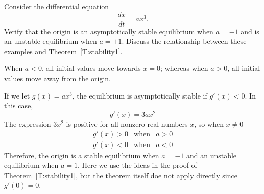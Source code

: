 \documentclass{ximera}
\begin{document}
\begin{exercise} \label{c3.3.5}
Consider the differential equation
\[
\frac{dx}{dt} = a x^3.
\]
Verify that the origin is an asymptotically
stable equilibrium when $a = -1$ and is an unstable
equilibrium when $a = +1$. Discuss the relationship
between these examples and Theorem~\ref{T:stability1}.

\begin{solution}

\ans When $a < 0$, all initial values move towards $x = 0$; whereas
when $a > 0$, all initial values move away from the origin. 

\soln If we let $g(x) = a x^3$, the equilibrium is asymptotically stable if $g'(x) < 0$.  In this case,
\[
g'(x) = 3a x^2
\]
The expression $3x^2$ is positive for all nonzero real numbers $x$, so
when $x \neq 0$
\[ \begin{array}{ccc}
g'(x) > 0 & \mbox{when} & a > 0 \\
g'(x) < 0 & \mbox{when} & a < 0 \end{array}
\]
Therefore, the origin is a stable equilibrium when $a = -1$ and
an unstable equilibrium when $a = 1$.  Here we use the ideas in the proof of Theorem~\ref{T:stability1}, but the theorem itself doe not apply directly since $g'(0)=0$.

\end{solution}
\end{exercise}
\end{document}
